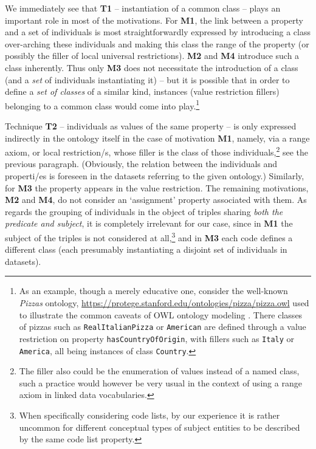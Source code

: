 We immediately see that \textbf{T1} -- instantiation of a common class -- plays an important role in most of the motivations.
For \textbf{M1}, the link between a property and a set of individuals is most straightforwardly expressed by introducing a class over-arching these individuals and making this class the range of the property (or possibly the filler of local universal restrictions).
\textbf{M2} and \textbf{M4} introduce such a class inherently.
Thus only \textbf{M3} does not necessitate the introduction of a class (and a \emph{set} of individuals instantiating it) -- but it is possible that in order to define a \emph{set of classes} of a similar kind, instances (value restriction fillers) belonging to a common class would come into play.\footnote{As an example, though a merely educative one, consider the well-known \emph{Pizzas} ontology, \url{https://protege.stanford.edu/ontologies/pizza/pizza.owl} used to illustrate the common caveats of OWL ontology modeling \cite{DBLP:conf/ekaw/RectorDHRKSWW04}. There classes of pizzas such as \texttt{RealItalianPizza} or \texttt{American} are defined through a value restriction on property \texttt{hasCountryOfOrigin}, with fillers such as \texttt{Italy} or \texttt{America}, all being instances of class \texttt{Country}.}

Technique \textbf{T2} -- individuals as values of the same property -- is only expressed indirectly in the ontology itself in the case of motivation \textbf{M1}, namely, via a range axiom, or local restriction/s, whose filler is the class of those individuals,\footnote{The filler also could be the enumeration of values instead of a named class, such a practice would however be very usual in the context of using a range axiom in linked data vocabularies.} see the previous paragraph. 
(Obviously, the relation between the individuals and properti/es is foreseen in the datasets referring to the given ontology.)
Similarly, for \textbf{M3} the property appears in the value restriction.
The remaining motivations, \textbf{M2} and \textbf{M4}, do not consider an `assignment' property associated with them.
As regards the grouping of individuals in the object of triples sharing  \emph{both the predicate and subject}, it is completely irrelevant for our case, since in \textbf{M1} the subject of the triples is not considered at all,\footnote{When specifically considering code lists, by our experience it is rather uncommon for different conceptual types of subject entities to be described by the same code list property.} and in \textbf{M3} each code defines a different class (each presumably instantiating a disjoint set of individuals in datasets).

